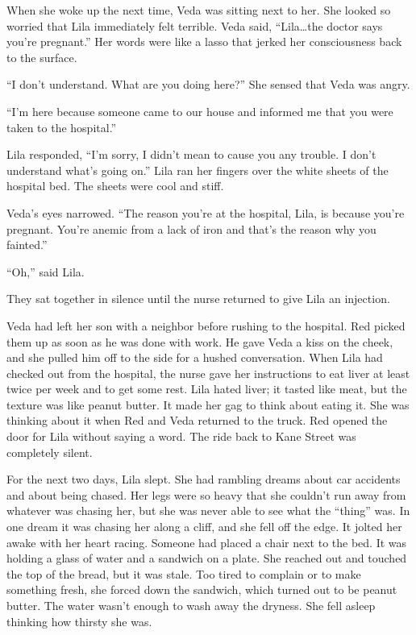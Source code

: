 \documentclass[
  letterpaper,
]{book}
\begin{document}
When she woke up the next time, Veda was sitting next to her. She looked
so worried that Lila immediately felt terrible. Veda said,
``Lila\ldots the doctor says you're pregnant.'' Her words were like a
lasso that jerked her consciousness back to the surface.

``I don't understand. What are you doing here?'' She sensed that Veda
was angry.

``I'm here because someone came to our house and informed me that you
were taken to the hospital.''

Lila responded, ``I'm sorry, I didn't mean to cause you any trouble. I
don't understand what's going on.'' Lila ran her fingers over the white
sheets of the hospital bed. The sheets were cool and stiff.

Veda's eyes narrowed. ``The reason you're at the hospital, Lila, is
because you're pregnant. You're anemic from a lack of iron and that's
the reason why you fainted.''

``Oh,'' said Lila.

They sat together in silence until the nurse returned to give Lila an
injection.

Veda had left her son with a neighbor before rushing to the hospital.
Red picked them up as soon as he was done with work. He gave Veda a kiss
on the cheek, and she pulled him off to the side for a hushed
conversation. When Lila had checked out from the hospital, the nurse
gave her instructions to eat liver at least twice per week and to get
some rest. Lila hated liver; it tasted like meat, but the texture was
like peanut butter. It made her gag to think about eating it. She was
thinking about it when Red and Veda returned to the truck. Red opened
the door for Lila without saying a word. The ride back to Kane Street
was completely silent.

For the next two days, Lila slept. She had rambling dreams about car
accidents and about being chased. Her legs were so heavy that she
couldn't run away from whatever was chasing her, but she was never able
to see what the ``thing'' was. In one dream it was chasing her along a
cliff, and she fell off the edge. It jolted her awake with her heart
racing. Someone had placed a chair next to the bed. It was holding a
glass of water and a sandwich on a plate. She reached out and touched
the top of the bread, but it was stale. Too tired to complain or to make
something fresh, she forced down the sandwich, which turned out to be
peanut butter. The water wasn't enough to wash away the dryness. She
fell asleep thinking how thirsty she was.
\end{document}
